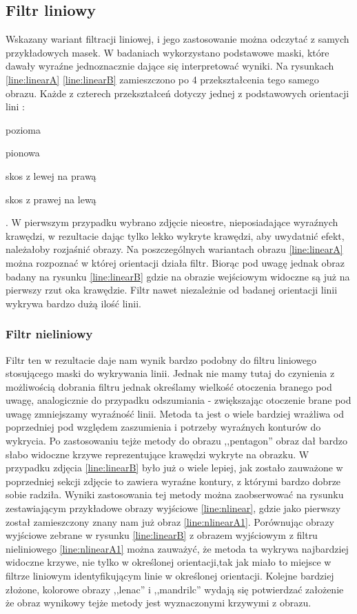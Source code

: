 \documentclass{classrep}
\begin{document}
\subsection{Filtr liniowy}
Wskazany wariant filtracji liniowej, i jego zastosowanie można odczytać z samych przykładowych masek. W badaniach wykorzystano podstawowe maski, które dawały wyraźne jednoznacznie dające się interpretować wyniki. Na rysunkach \ref{line:linearA} \ref{line:linearB}  zamieszczono po 4 przekształcenia tego samego obrazu. Każde z czterech przekształceń dotyczy jednej z podstawowych orientacji lini :
 \begin{inparaenum}
\item pozioma
\item pionowa
\item skos z lewej na prawą
\item skos z prawej na lewą
\end{inparaenum}. W pierwszym przypadku wybrano zdjęcie nieostre, nieposiadające wyraźnych krawędzi, w rezultacie dając tylko lekko wykryte krawędzi, aby uwydatnić efekt, należałoby rozjaśnić obrazy. Na poszczególnych wariantach obrazu  \ref{line:linearA} można rozpoznać w której orientacji działa filtr. Biorąc pod uwagę jednak obraz badany na rysunku \ref{line:linearB} gdzie na obrazie wejściowym widoczne są już na pierwszy rzut oka krawędzie. Filtr nawet niezależnie od badanej orientacji linii wykrywa bardzo dużą ilość linii.


\subsubsection{Filtr nieliniowy}

Filtr ten w rezultacie daje nam wynik bardzo podobny do filtru liniowego stosującego maski do wykrywania linii. Jednak nie mamy tutaj do czynienia z możliwością dobrania filtru jednak określamy wielkość otoczenia branego pod uwagę, analogicznie do przypadku odszumiania - zwiększając otoczenie brane pod uwagę zmniejszamy wyraźność linii. Metoda ta jest o wiele bardziej wrażliwa od poprzedniej pod względem zaszumienia i potrzeby wyraźnych konturów do wykrycia. Po zastosowaniu tejże metody do obrazu ,,pentagon'' obraz dał bardzo słabo widoczne krzywe reprezentujące krawędzi wykryte na obrazku. W przypadku zdjęcia \ref{line:linearB} było już o wiele lepiej, jak zostało zauważone w poprzedniej sekcji zdjęcie to zawiera wyraźne kontury, z którymi bardzo dobrze sobie radziła. Wyniki zastosowania tej metody można zaobserwować na rysunku zestawiającym przykładowe obrazy wyjściowe \ref{line:nlinear}, gdzie jako pierwszy został zamieszczony znany nam już obraz \ref{line:nlinearA1}. Porównując obrazy wyjściowe zebrane w  rysunku \ref{line:linearB} z obrazem wyjściowym z filtru nieliniowego \ref{line:nlinearA1} można zauważyć, że metoda ta wykrywa najbardziej widoczne krzywe, nie tylko w określonej orientacji,tak jak miało to miejsce w filtrze liniowym identyfikującym linie w określonej orientacji. Kolejne bardziej złożone, kolorowe obrazy ,,lenac'' i ,,mandrilc'' wydają się potwierdzać założenie że obraz wynikowy tejże metody jest wyznaczonymi krzywymi z obrazu.
\end{document}
